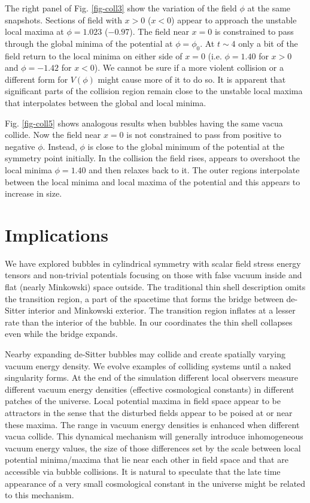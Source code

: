 \documentclass[preprintnumbers,eqsecnum,aps,prd,epsf,showpacs,nofootinbib
]{revtex4}
\begin{document}
The right panel of Fig. \ref{fig-coll3} show the variation of the
field $\phi$ at the same snapshots.  Sections of field with $x>0$
($x<0$) appear to approach the unstable local maxima at $\phi=1.023$
($-0.97$). The field near $x=0$ is constrained to pass through the
global minima of the potential at $\phi=\phi_0$.  At $t \sim 4$ only a
bit of the field return to the local minima on either side of $x=0$
(i.e. $\phi=1.40$ for $x>0$ and $\phi=-1.42$ for $x<0$).  We cannot be
sure if a more violent collision or a different form for $V(\phi)$
might cause more of it to do so. It is apparent that significant parts
of the collision region remain close to the unstable local maxima that
interpolates between the global and local minima.

Fig. \ref{fig-coll5} shows analogous results when bubbles having the
same vacua collide. Now the field near $x=0$ is not constrained to
pass from positive to negative $\phi$. Instead, $\phi$ is close to the
global minimum of the potential at the symmetry point initially. In
the collision the field rises, appears to overshoot the local minima
$\phi=1.40$ and then relaxes back to it. The outer regions interpolate
between the local minima and local maxima of the potential and this
appears to increase in size.

\section{Implications}

We have explored bubbles in cylindrical symmetry with scalar field
stress energy tensors and non-trivial potentials focusing on those
with false vacuum inside and flat (nearly Minkowski) space
outside. The traditional thin shell description omits the transition
region, a part of the spacetime that forms the bridge between
de-Sitter interior and Minkowski exterior.  The transition region
inflates at a lesser rate than the interior of the bubble.  In our
coordinates the thin shell collapses even while the bridge expands.

Nearby expanding de-Sitter bubbles may collide and create spatially
varying vacuum energy density. We evolve examples of colliding systems
until a naked singularity forms. At the end of the simulation
different local observers measure different vacuum energy densities
(effective cosmological constants) in different patches of the
universe. Local potential maxima in field space appear to be
attractors in the sense that the disturbed fields appear to be poised
at or near these maxima. The range in vacuum energy densities is
enhanced when different vacua collide. This dynamical mechanism will
generally introduce inhomogeneous vacuum energy values, the size of
those differences set by the scale between local potential
minima/maxima that lie near each other in field space and that are
accessible via bubble collisions. It is natural to speculate that the
late time appearance of a very small cosmological constant in the
universe might be related to this mechanism.
\end{document}
